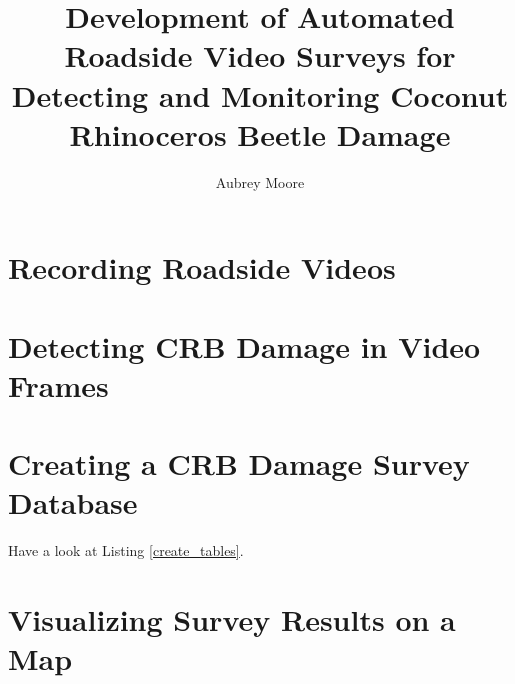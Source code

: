 \documentclass[]{scrartcl}
\title{Development of Automated Roadside Video Surveys for Detecting and Monitoring Coconut Rhinoceros Beetle Damage}
\author{Aubrey Moore}
\begin{document}
\maketitle
\tableofcontents
\lstlistoflistings

\newpage


\section{Recording Roadside Videos}

\section{Detecting CRB Damage in Video Frames}

\section{Creating a CRB Damage Survey Database}

Have a look at Listing \ref{create_tables}.

\label{create_tables}







\section{Visualizing Survey Results on a Map}


\end{document}
